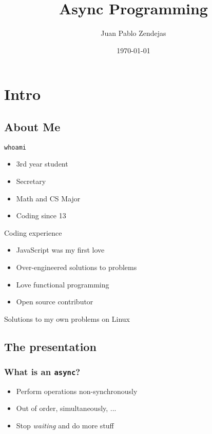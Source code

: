 \documentclass{beamer}
\title{Async Programming}
\author{Juan Pablo Zendejas}
\institute{ACM@SDSU}
\date{\today}
\begin{document}
\frame{\maketitle}

\section{Intro}

\subsection{About Me}
\begin{frame}{\texttt{whoami}}
	\begin{itemize}
		\item 3rd year student
		\item Secretary
		\item Math and CS Major
		\item Coding since 13
	\end{itemize}


\end{frame}

\begin{frame}{Coding experience}
	\begin{itemize}
		\item JavaScript was my first love
		\item Over-engineered solutions to problems
		\item Love functional programming
		\item Open source contributor
	\end{itemize}
	Solutions to my own problems on Linux
\end{frame}

\subsection{The presentation}

\begin{frame}
	\frametitle{What is an \texttt{async}?}
	\begin{itemize}
		\item Perform operations non-synchronously
		\item Out of order, simultaneously, ...
		\item Stop \emph{waiting} and do more stuff
	\end{itemize}
\end{frame}
\end{document}
